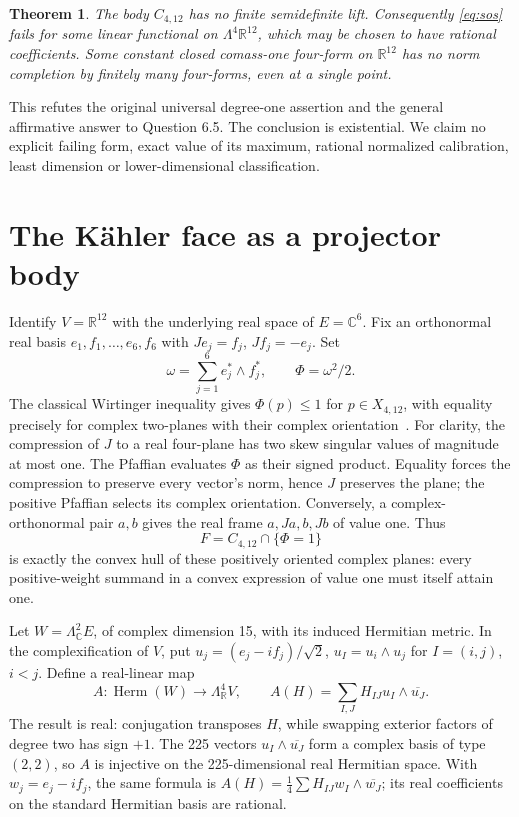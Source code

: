 \documentclass[11pt]{article}
\newtheorem{theorem}{Theorem}
\newcommand{\Herm}{\operatorname{Herm}}
\begin{document}
\begin{theorem}\label{thm:main}
The body $C_{4,12}$ has no finite semidefinite lift. Consequently
\eqref{eq:sos} fails for some linear functional on $\Lambda^4\mathbb R^{12}$,
which may be chosen to have rational coefficients. Some constant closed
comass-one four-form on $\mathbb R^{12}$ has no norm completion by finitely
many four-forms, even at a single point.
\end{theorem}

This refutes the original universal degree-one assertion and the general
affirmative answer to Question 6.5. The conclusion is existential. We claim
no explicit failing form, exact value of its maximum, rational normalized
calibration, least dimension or lower-dimensional classification.

\section{The K\"ahler face as a projector body}
Identify $V=\mathbb R^{12}$ with the underlying real space of
$E=\mathbb C^6$. Fix an orthonormal real basis $e_1,f_1,\ldots,e_6,f_6$
with $Je_j=f_j$, $Jf_j=-e_j$. Set
\[
 \omega=\sum_{j=1}^6 e_j^*\wedge f_j^*,\qquad \Phi=\omega^2/2.
\]
The classical Wirtinger inequality gives $\Phi(p)\leq1$ for $p\in X_{4,12}$,
with equality precisely for complex two-planes with their complex
orientation~\cite{hl,barvinok}. For clarity, the compression of $J$ to a
real four-plane has two skew singular values of magnitude at most one.
The Pfaffian evaluates $\Phi$ as their signed product. Equality forces
the compression to preserve every vector's norm, hence $J$ preserves the
plane; the positive Pfaffian selects its complex orientation. Conversely,
a complex-orthonormal pair $a,b$ gives the real frame $a,Ja,b,Jb$ of value
one. Thus
\[
 F=C_{4,12}\cap\{\Phi=1\}
\]
is exactly the convex hull of these positively oriented complex planes:
every positive-weight summand in a convex expression of value one must
itself attain one.

Let $W=\Lambda^2_{\mathbb C}E$, of complex dimension 15, with its induced
Hermitian metric. In the complexification of $V$, put
$u_j=(e_j-if_j)/\sqrt2$, $u_I=u_i\wedge u_j$ for $I=(i,j)$, $i<j$.
Define a real-linear map
\begin{equation}\label{eq:map}
 A:\Herm(W)\longrightarrow\Lambda^4_{\mathbb R}V,
 \qquad A(H)=\sum_{I,J}H_{IJ}u_I\wedge\overline{u_J}.
\end{equation}
The result is real: conjugation transposes $H$, while swapping exterior
factors of degree two has sign $+1$. The 225 vectors
$u_I\wedge\overline{u_J}$ form a complex basis of type $(2,2)$, so $A$ is
injective on the 225-dimensional real Hermitian space. With
$w_j=e_j-if_j$, the same formula is
$A(H)=\tfrac14\sum H_{IJ}w_I\wedge\overline{w_J}$; its real coefficients
on the standard Hermitian basis are rational.
\end{document}
